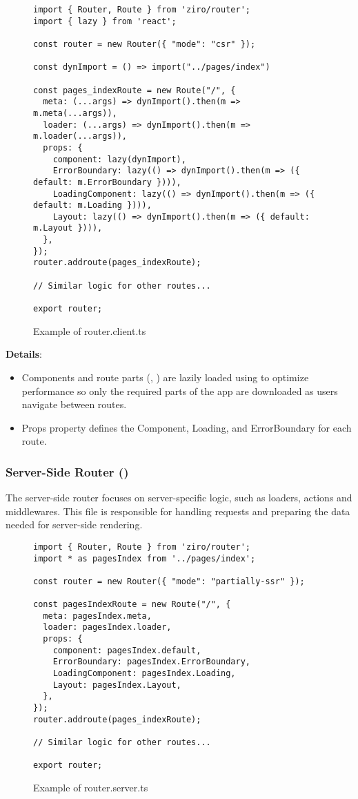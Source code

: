 \begin{figure}[H]
\begin{verbatim}
import { Router, Route } from 'ziro/router';
import { lazy } from 'react';

const router = new Router({ "mode": "csr" });

const dynImport = () => import("../pages/index")

const pages_indexRoute = new Route("/", {
  meta: (...args) => dynImport().then(m => m.meta(...args)),
  loader: (...args) => dynImport().then(m => m.loader(...args)),
  props: {
    component: lazy(dynImport),
    ErrorBoundary: lazy(() => dynImport().then(m => ({ default: m.ErrorBoundary }))),
    LoadingComponent: lazy(() => dynImport().then(m => ({ default: m.Loading }))),
    Layout: lazy(() => dynImport().then(m => ({ default: m.Layout }))),
  },
});
router.addroute(pages_indexRoute);

// Similar logic for other routes...

export router;
\end{verbatim}
\caption{Example of router.client.ts}
\end{figure}

\textbf{Details}:
\begin{itemize}
  \item Components and route parts (, ) are lazily loaded using  to optimize performance so only the required parts of the app are downloaded as users navigate between routes.
  \item Props property defines the Component, Loading, and ErrorBoundary for each route.
\end{itemize}

\subsubsection{Server-Side Router ()}

The server-side router focuses on server-specific logic, such as loaders, actions and middlewares. This file is responsible for handling requests and preparing the data needed for server-side rendering.

\begin{figure}[H]
\begin{verbatim}
import { Router, Route } from 'ziro/router';
import * as pagesIndex from '../pages/index';

const router = new Router({ "mode": "partially-ssr" });

const pagesIndexRoute = new Route("/", {
  meta: pagesIndex.meta,
  loader: pagesIndex.loader,
  props: {
    component: pagesIndex.default,
    ErrorBoundary: pagesIndex.ErrorBoundary,
    LoadingComponent: pagesIndex.Loading,
    Layout: pagesIndex.Layout,
  },
});
router.addroute(pages_indexRoute);

// Similar logic for other routes...

export router;
\end{verbatim}
\caption{Example of router.server.ts}
\end{figure}


